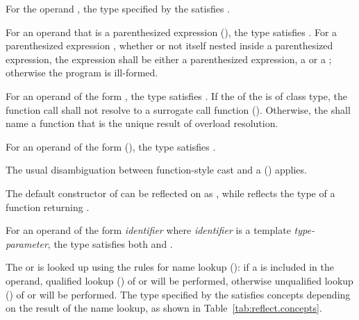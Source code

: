 \begin{std.txt}
\pnum
For the operand \tcode{::}, the type specified by the
 satisfies .

\pnum
For an operand that is a parenthesized expression (),
the type satisfies \linebreak{}.  For a
parenthesized expression , whether or not itself nested inside a
parenthesized expression, the expression  shall be either a
parenthesized expression, a  or a
; otherwise the program is
ill-formed.

\pnum
For an operand of the form , the type
satisfies \linebreak{}.  If the
 of the 
is of class type, the function call shall not resolve to a surrogate call
function (). Otherwise, the
 shall name a function that is the unique result
of overload resolution.

\pnum
For an operand of the form 
(), the type satisfies \linebreak{}.
\begin{note}
The usual disambiguation between function-style cast and a
 () applies.
\begin{example}
The default constructor of  can be reflected on as
, while  reflects the type of a
function returning .
\end{example}
\end{note}

\pnum
For an
operand of the form \emph{identifier} where \emph{identifier} is a template
\emph{type-parameter}, the type satisfies both  and
.

\pnum
The  or  is looked up
using the rules for name lookup (): if a
 is included in the operand, qualified lookup
() of  or
 will be performed,
otherwise unqualified lookup () of
 or  will be performed.
The type specified by the  satisfies concepts
depending on the result of the name lookup, as shown in
Table~\ref{tab:reflect.concepts}.


\end{std.txt}
